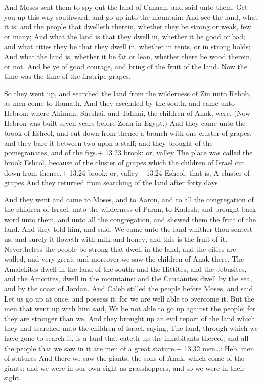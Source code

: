  And Moses sent them to spy out the land of Canaan, and
said unto them, Get you up this way southward, and go up into the
mountain:  And see the land, what it is; and the people
that dwelleth therein, whether they be strong or weak, few or many;
 And what the land is that they dwell in, whether it be
good or bad; and what cities they be that they dwell in, whether in
tents, or in strong holds;  And what the land is, whether
it be fat or lean, whether there be wood therein, or not. And be ye of
good courage, and bring of the fruit of the land. Now the time was the
time of the firstripe grapes.

 So they went up, and searched the land from the
wilderness of Zin unto Rehob, as men come to Hamath.  And
they ascended by the south, and came unto Hebron; where Ahiman, Sheshai,
and Talmai, the children of Anak, were. (Now Hebron was built seven
years before Zoan in Egypt.)  And they came unto the brook
of Eshcol, and cut down from thence a branch with one cluster of grapes,
and they bare it between two upon a staff; and they brought of the
pomegranates, and of the figs.+ 13.23 brook: or, valley 
The place was called the brook Eshcol, because of the cluster of grapes
which the children of Israel cut down from thence.+ 13.24 brook: or,
valley+ 13.24 Eshcol: that is, A cluster of grapes  And
they returned from searching of the land after forty days.

 And they went and came to Moses, and to Aaron, and to
all the congregation of the children of Israel, unto the wilderness of
Paran, to Kadesh; and brought back word unto them, and unto all the
congregation, and shewed them the fruit of the land.  And
they told him, and said, We came unto the land whither thou sentest us,
and surely it floweth with milk and honey; and this is the fruit of it.
 Nevertheless the people be strong that dwell in the land,
and the cities are walled, and very great: and moreover we saw the
children of Anak there.  The Amalekites dwell in the land
of the south: and the Hittites, and the Jebusites, and the Amorites,
dwell in the mountains: and the Canaanites dwell by the sea, and by the
coast of Jordan.  And Caleb stilled the people before
Moses, and said, Let us go up at once, and possess it; for we are well
able to overcome it.  But the men that went up with him
said, We be not able to go up against the people; for they are stronger
than we.  And they brought up an evil report of the land
which they had searched unto the children of Israel, saying, The land,
through which we have gone to search it, is a land that eateth up the
inhabitants thereof; and all the people that we saw in it are men of a
great stature.+ 13.32 men\ldots: Heb. men of statures  And
there we saw the giants, the sons of Anak, which come of the giants: and
we were in our own sight as grasshoppers, and so we were in their sight.

